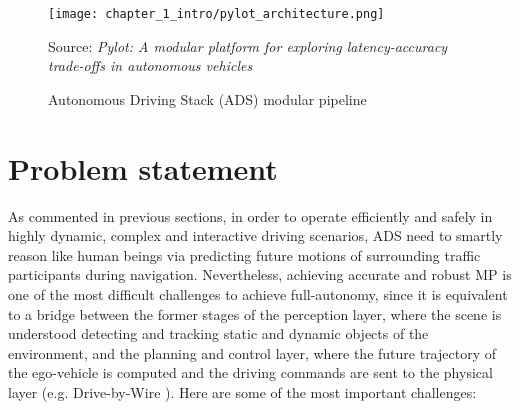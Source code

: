 \begin{figure}[h]
	\centering
	\texttt{[image: chapter\_1\_intro/pylot\_architecture.png]}
	\caption{Autonomous Driving Stack (ADS) modular pipeline}
	Source: \textit{Pylot: A modular platform for exploring latency-accuracy trade-offs in autonomous vehicles} \cite{gog2021pylot}
	\label{fig:chapter_1_intro/pylot_architecture}
\end{figure}

\section{Problem statement}
\label{sec:1_problem_statement}

As commented in previous sections, in order to operate efficiently and safely in highly dynamic, complex and interactive driving scenarios, \acs{ADS} need to smartly reason like human beings via predicting future motions of surrounding traffic participants during navigation. Nevertheless, achieving accurate and robust \ac{MP} is one of the most difficult challenges to achieve full-autonomy, since it is equivalent to a bridge between the former stages of the perception layer, where the scene is understood detecting and tracking static and dynamic objects of the environment, and the planning and control layer, where the future trajectory of the ego-vehicle is computed and the driving commands are sent to the physical layer (e.g. Drive-by-Wire \cite{arango2020drive}). Here are some of the most important challenges: 

